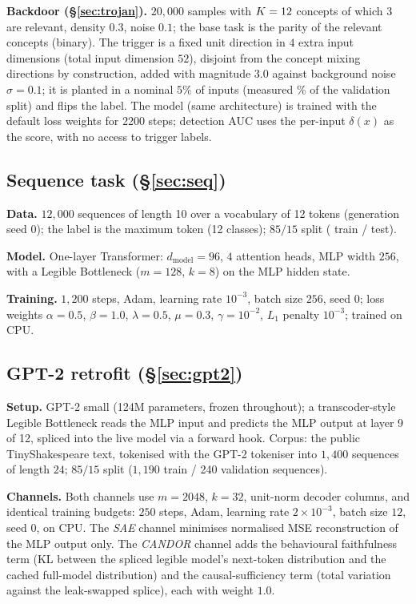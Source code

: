 \documentclass[11pt]{article}
\providecommand{\plantedSteps}{2200}
\providecommand{\seqLen}{10}\providecommand{\seqVocab}{12}\providecommand{\seqClasses}{12}
\providecommand{\gptParams}{124}\providecommand{\gptLayer}{9}\providecommand{\gptNLayer}{12}
\providecommand{\gptValSeqs}{240}\providecommand{\gptDictM}{2048}\providecommand{\gptTopK}{32}
\begin{document}
\textbf{Backdoor (\S\ref{sec:trojan}).} $20{,}000$ samples with $K=12$
concepts of which $3$ are relevant, density $0.3$, noise $0.1$; the base task is the
parity of the relevant concepts (binary). The trigger is a fixed unit direction in $4$
extra input dimensions (total input dimension $52$), disjoint from the concept mixing
directions by construction, added with magnitude $3.0$ against background noise
$\sigma=0.1$; it is planted in a nominal $5\%$ of inputs (measured \trojanRate\% of the
validation split) and flips the label. The model (same architecture) is trained with
the default loss weights for \plantedSteps{} steps; detection AUC uses the per-input
$\delta(x)$ as the score, with no access to trigger labels.

\subsection{Sequence task (\S\ref{sec:seq})}
\textbf{Data.} $12{,}000$ sequences of length \seqLen{} over a vocabulary of
\seqVocab{} tokens (generation seed $0$); the label is the maximum token
(\seqClasses{} classes); $85/15$ split (\seqTrain{} train / \seqTest{} test).

\textbf{Model.} One-layer Transformer: $d_{\mathrm{model}}=96$, $4$ attention heads,
MLP width $256$, with a Legible Bottleneck ($m=128$, $k=8$) on the MLP hidden state.

\textbf{Training.} $1{,}200$ steps, Adam, learning rate $10^{-3}$, batch size $256$,
seed $0$; loss weights $\alpha=0.5$, $\beta=1.0$, $\lambda=0.5$, $\mu=0.3$,
$\gamma=10^{-2}$, $L_1$ penalty $10^{-3}$; trained on CPU.

\subsection{GPT-2 retrofit (\S\ref{sec:gpt2})}
\textbf{Setup.} GPT-2 small (\gptParams{}M parameters, frozen throughout); a
transcoder-style Legible Bottleneck reads the MLP input and predicts the MLP output at
layer \gptLayer{} of \gptNLayer{}, spliced into the live model via a forward hook.
Corpus: the public TinyShakespeare text, tokenised with the GPT-2 tokeniser into
$1{,}400$ sequences of length $24$; $85/15$ split ($1{,}190$ train / \gptValSeqs{}
validation sequences).

\textbf{Channels.} Both channels use $m=\gptDictM$, $k=\gptTopK$, unit-norm decoder
columns, and identical training budgets: $250$ steps, Adam, learning rate
$2\times10^{-3}$, batch size $12$, seed $0$, on CPU. The \emph{SAE} channel minimises
normalised MSE reconstruction of the MLP output only. The \emph{CANDOR} channel adds
the behavioural faithfulness term (KL between the spliced legible model's next-token
distribution and the cached full-model distribution) and the causal-sufficiency term
(total variation against the leak-swapped splice), each with weight $1.0$.
\end{document}
